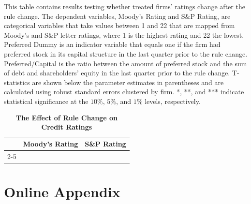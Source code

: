 \documentclass[a4paper, 12pt]{article}
\begin{document}
\begin{table}[htbp]
\caption{\textbf{The Effect of Rule Change on Credit Ratings}} \label{table_cr}
\begin{singlespace}
\begin{small}

\noindent   This table contains results testing whether treated firms' ratings change after the rule change. The dependent variables, Moody's Rating and S\&P Rating, are categorical variables that take values between 1 and 22 that are mapped from Moody's and S\&P letter ratings, where 1 is the highest rating and 22 the lowest. Preferred Dummy is an indicator variable that equals one if the firm had preferred stock in its capital structure in the last quarter prior to the rule change. Preferred/Capital is the ratio between the amount of preferred stock and the sum of debt and shareholders' equity in the last quarter prior to the rule change.  T-statistics are shown below the parameter estimates in parentheses and are calculated using robust standard errors clustered by firm. *, **, and *** indicate statistical significance at the $10\%$, $5\%$, and $1\%$ levels, respectively.
\end{small}
\end{singlespace}
\vspace{3mm}

\small
  \centering
    \begin{tabular}{lcccc}
    \toprule
    \textbf{ } &
      \multicolumn{2}{c}{\textbf{Moody's Rating}} &  \multicolumn{2}{c}{\textbf{S\&P Rating}}

      \\
           \cline{2-5}




    \bottomrule
    \end{tabular}
\end{table}


\clearpage
\newpage


\newpage


\section*{Online Appendix}
\renewcommand{\thefigure}{A.\arabic{figure}}
\renewcommand{\thetable}{A.\arabic{table}}
\setcounter{figure}{0}
\setcounter{table}{0}
\end{document}
